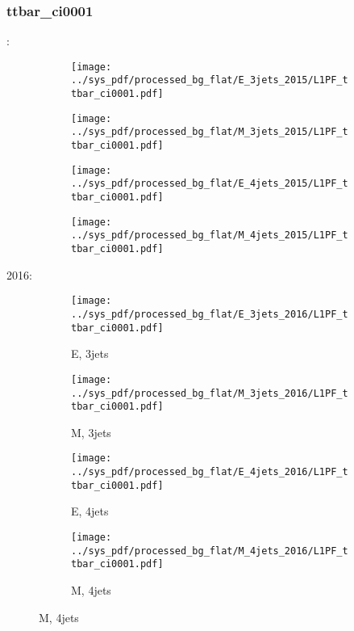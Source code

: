 \documentclass{beamer}
\begin{document}
\begin{frame}
\frametitle{ttbar_ci0001}
\fontsize{5}{1}:
\begin{figure}
\centering
\begin{subfigure}[b]{0.24\textwidth}
\texttt{[image: ../sys\_pdf/processed\_bg\_flat/E\_3jets\_2015/L1PF\_ttbar\_ci0001.pdf]}
\end{subfigure}
\begin{subfigure}[b]{0.24\textwidth}
\texttt{[image: ../sys\_pdf/processed\_bg\_flat/M\_3jets\_2015/L1PF\_ttbar\_ci0001.pdf]}
\end{subfigure}
\begin{subfigure}[b]{0.24\textwidth}
\texttt{[image: ../sys\_pdf/processed\_bg\_flat/E\_4jets\_2015/L1PF\_ttbar\_ci0001.pdf]}
\end{subfigure}
\begin{subfigure}[b]{0.24\textwidth}
\texttt{[image: ../sys\_pdf/processed\_bg\_flat/M\_4jets\_2015/L1PF\_ttbar\_ci0001.pdf]}
\end{subfigure}
\end{figure}
2016:
\begin{figure}
\centering
\begin{subfigure}[b]{0.24\textwidth}
\texttt{[image: ../sys\_pdf/processed\_bg\_flat/E\_3jets\_2016/L1PF\_ttbar\_ci0001.pdf]}
\captionsetup{font=tiny}
\caption{E, 3jets}
\end{subfigure}
\begin{subfigure}[b]{0.24\textwidth}
\texttt{[image: ../sys\_pdf/processed\_bg\_flat/M\_3jets\_2016/L1PF\_ttbar\_ci0001.pdf]}
\captionsetup{font=tiny}
\caption{M, 3jets}
\end{subfigure}
\begin{subfigure}[b]{0.24\textwidth}
\texttt{[image: ../sys\_pdf/processed\_bg\_flat/E\_4jets\_2016/L1PF\_ttbar\_ci0001.pdf]}
\captionsetup{font=tiny}
\caption{E, 4jets}
\end{subfigure}
\begin{subfigure}[b]{0.24\textwidth}
\texttt{[image: ../sys\_pdf/processed\_bg\_flat/M\_4jets\_2016/L1PF\_ttbar\_ci0001.pdf]}
\captionsetup{font=tiny}
\caption{M, 4jets}
\end{subfigure}
\end{figure}
\end{frame}
\end{document}
